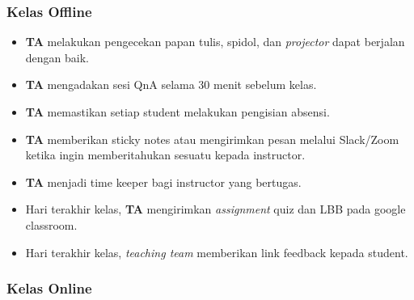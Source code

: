 \documentclass[
]{book}
\providecommand{\tightlist}{%
  \setlength{\itemsep}{0pt}\setlength{\parskip}{0pt}}
\begin{document}
\hypertarget{kelas-offline-1}{%
\subsubsection{Kelas Offline}\label{kelas-offline-1}}

\begin{itemize}
\tightlist
\item
  \textbf{TA} melakukan pengecekan papan tulis, spidol, dan \emph{projector} dapat berjalan dengan baik.
\item
  \textbf{TA} mengadakan sesi QnA selama 30 menit sebelum kelas.
\item
  \textbf{TA} memastikan setiap student melakukan pengisian absensi.
\item
  \textbf{TA} memberikan sticky notes atau mengirimkan pesan melalui Slack/Zoom ketika ingin memberitahukan sesuatu kepada instructor.
\item
  \textbf{TA} menjadi time keeper bagi instructor yang bertugas.
\item
  Hari terakhir kelas, \textbf{TA} mengirimkan \emph{assignment} quiz dan LBB pada google classroom.
\item
  Hari terakhir kelas, \emph{teaching team} memberikan link feedback kepada student.
\end{itemize}

\hypertarget{kelas-online-1}{%
\subsubsection{Kelas Online}\label{kelas-online-1}}
\end{document}
